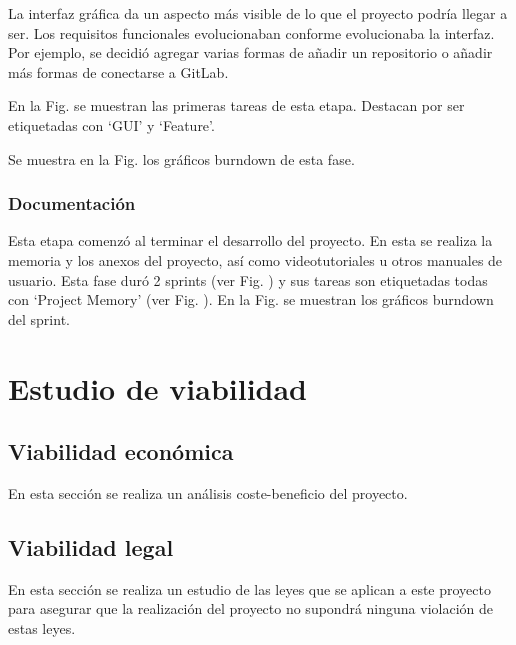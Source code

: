 La interfaz gráfica da un aspecto más visible de lo que el proyecto podría llegar a ser. Los requisitos funcionales evolucionaban conforme evolucionaba la interfaz. Por ejemplo, se decidió agregar varias formas de añadir un repositorio o añadir más formas de conectarse a GitLab.

En la Fig. se muestran las primeras tareas de esta etapa. Destacan por ser etiquetadas con `GUI' y `Feature'.

Se muestra en la Fig. los gráficos burndown de esta fase.


\subsubsection{Documentación}
Esta etapa comenzó al terminar el desarrollo del proyecto. En esta se realiza la memoria y los anexos del proyecto, así como videotutoriales u otros manuales de usuario. Esta fase duró 2 sprints (ver Fig. ) y sus tareas son etiquetadas todas con `Project Memory' (ver Fig. ). En la Fig. se muestran los gráficos burndown del sprint.

\section{Estudio de viabilidad}
\subsection{Viabilidad económica}
En esta sección se realiza un análisis coste-beneficio del proyecto.

\subsection{Viabilidad legal}
En esta sección se realiza un estudio de las leyes que se aplican a este proyecto para asegurar que la realización del proyecto no supondrá ninguna violación de estas leyes. 



